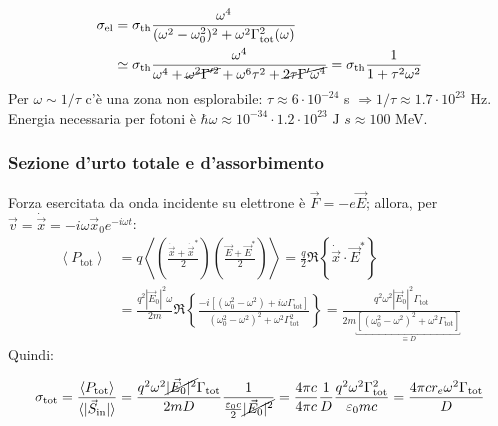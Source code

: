 \documentclass[10pt, a4paper]{scrartcl}
\numberwithin{equation}{subsection}
\theoremstyle{style1}
\newenvironment{boxenv}[1][]{
    \begin{eqbox}[#1]
    }{
   \end{eqbox}
}
\begin{document}
\begin{itemize}
\begin{equation}
\begin{split}
				\sigma _\text{el} &=\sigma _\text{th} \frac{\omega^4}{(\omega^2-\omega_0^2)^2 + \omega^2  \Gamma_\text{tot}^2(\omega)} \\
					     &\simeq \sigma _\text{th} \frac{\omega^4}{\omega^4 + \cancel{\omega^2 \Gamma'^2} + \omega^6 \tau ^2 + \cancel{2 \tau \Gamma' \omega^4}} = \sigma _\text{th} \frac{1}{1 + \tau ^2 \omega^2}
			\end{split}
		\end{equation}
		Per $\omega \sim 1/\tau $ c'\`e una zona non esplorabile: $\tau \approx 6\cdot 10^{-24 }$ s $\Rightarrow  1 / \tau \approx 1.7 \cdot 10^{23} $ Hz. Energia necessaria per fotoni \`e $\hbar  \omega \approx 10^{-34}  \cdot 1.2 \cdot 10^{23} \text{ J } s \approx 100$   MeV.
\end{itemize}
\subsubsection{Sezione d'urto totale e d'assorbimento}
Forza esercitata da onda incidente su elettrone \`e $\vec{F}= -e\vec{E}$; allora, per $\vec{v}= \dot{\vec{x}} = -i\omega \vec{x}_0 e^{-i\omega t} $:
\begin{equation}
	\begin{split}
		\left\langle P_\text{tot} \right\rangle &= q\left\langle \left(\frac{\dot{\vec{x}}+ \dot{\vec{x}}^*}{2}\right) \left(\frac{\vec{E}+\vec{E}^*}{2}\right)  \right\rangle = \frac{q}{2} \Re \left\{ \dot{\vec{x}}\cdot \vec{E}^* \right\} \\
							&= \frac{q^2 |\vec{E}_0|^2 \omega }{2m} \Re \left\{ \frac{- i \left[ (\omega_0^2 - \omega^2) + i\omega \Gamma_{\text{tot}}  \right] }{(\omega_0^2 - \omega^2)^2 + \omega^2 \Gamma^2_\text{tot}} \right\} = \frac{q^2 \omega^2 |\vec{E}_0|^2 \Gamma_\text{tot}}{2m \underbracket{\left[ (\omega_0^2 - \omega^2)^2 + \omega^2 \Gamma_{\text{tot}}  \right]}_{\equiv D}  }
	\end{split}
\end{equation}
Quindi:
\begin{boxenv}[]
\begin{equation}
	\sigma _\text{tot} = \frac{\left\langle P_\text{tot} \right\rangle}{\langle|\vec{S}_\text{in}|\rangle} = \frac{q^2 \omega^2 \cancel{|\vec{E}_0|^2}\Gamma_{\text{tot}} }{2mD} \frac{1}{\frac{\varepsilon _0 c}{2}\cancel{|\vec{E}_0|^2}} = \frac{4\pi c}{4\pi c} \frac{1}{D} \frac{q^2 \omega^2 \Gamma_\text{tot}^2}{\varepsilon _0 m c}= \frac{4\pi cr_e \omega^2 \Gamma_\text{tot}}{D}
\end{equation}
\end{boxenv}
\end{document}
